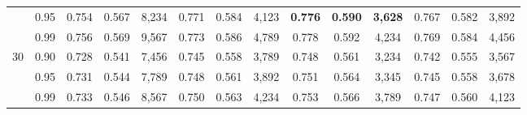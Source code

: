 \documentclass[journal]{IEEEtran}
\theoremstyle{definition}
\theoremstyle{remark} %
\begin{document}
\begin{table}[t]
\begin{threeparttable}
\begin{tabular}{cccccccccccccc}
                                & 0.95                & 0.754                                  & 0.567                                  & 8,234                                   & 0.771                                   & 0.584 & 4,123    & \textbf{0.776} & \textbf{0.590} & \textbf{3,628} & 0.767 & 0.582 & 3,892    \\
                                & 0.99                & 0.756                                  & 0.569                                  & 9,567                                   & 0.773                                   & 0.586 & 4,789    & 0.778          & 0.592          & 4,234          & 0.769 & 0.584 & 4,456    \\
            \midrule
            \multirow{3}{*}{30} & 0.90                & 0.728                                  & 0.541                                  & 7,456                                   & 0.745                                   & 0.558 & 3,789    & 0.748          & 0.561          & 3,234          & 0.742 & 0.555 & 3,567    \\
                                & 0.95                & 0.731                                  & 0.544                                  & 7,789                                   & 0.748                                   & 0.561 & 3,892    & 0.751          & 0.564          & 3,345          & 0.745 & 0.558 & 3,678    \\
                                & 0.99                & 0.733                                  & 0.546                                  & 8,567                                   & 0.750                                   & 0.563 & 4,234    & 0.753          & 0.566          & 3,789          & 0.747 & 0.560 & 4,123    \\
            \bottomrule
        \end{tabular}
    \end{threeparttable}
\end{table}
\end{document}
